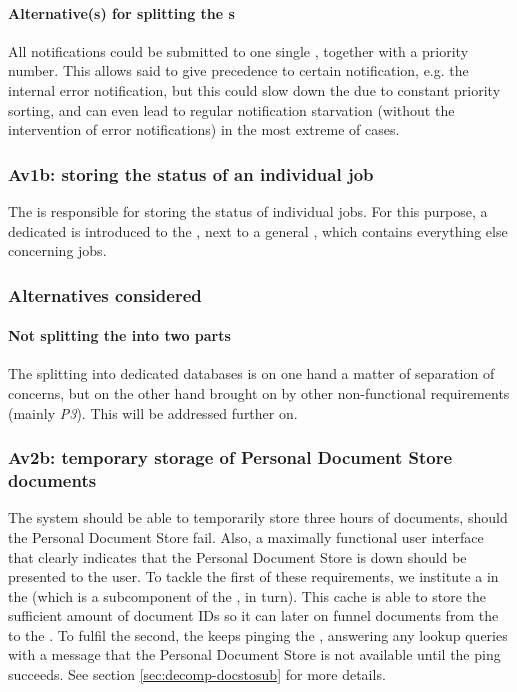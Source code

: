 \paragraph{Alternative(s) for splitting the s} All notifications could be submitted to one single , together with a priority number. This allows said  to give precedence to certain notification, e.g. the internal error notification, but this could slow down the  due to constant priority sorting, and can even lead to regular notification starvation (without the intervention of error notifications) in the most extreme of cases.

\subsubsection{Av1b: storing the status of an individual job}\label{march:av1b}
The  is responsible for storing the status of individual jobs. For this purpose, a dedicated  is introduced to the , next to a general , which contains everything else concerning jobs.

\subsubsection*{Alternatives considered}
\paragraph{Not splitting the  into two parts} The splitting into dedicated databases is on one hand a matter of separation of concerns, but on the other hand brought on by other non-functional requirements (mainly \emph{P3}). This will be addressed further on.

\subsubsection{Av2b: temporary storage of Personal Document Store documents}\label{march:av2b}
The system should be able to temporarily store three hours of documents, should the Personal Document Store fail. Also, a maximally functional user interface that clearly indicates that the Personal Document Store is down should be presented to the user. To tackle the first of these requirements, we institute a  in the  (which is a subcomponent of the , in turn). This cache is able to store the sufficient amount of document IDs so it can later on funnel documents from the  to the . To fulfil the second, the  keeps pinging the , answering any lookup queries with a message that the Personal Document Store is not available until the ping succeeds. See section \ref{sec:decomp-docstosub} for more details.

